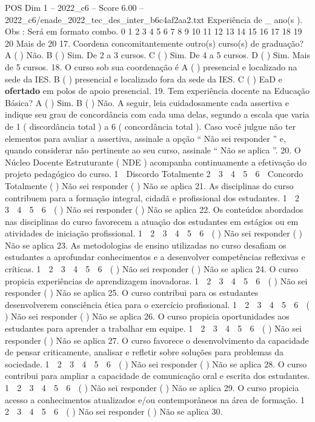 \begin{textsample}{POS Dim 1 – 2022\_c6 – Score 6.00 – 2022\_c6/enade\_2022\_tec\_des\_inter\_b6c4af2aa2.txt}
Experiência de \_ ano(s ).
Obs : Será em formato combo. 0 1 2 3 4 5 6 7 8 9 10 11 12 13 14 15 16 17 18 19 20 Mais de 20 17.
Coordena concomitantemente outro(s) curso(s) de graduação?
A ( ) Não.
B ( ) Sim.
De 2 a 3 cursos.
C ( ) Sim.
De 4 a 5 cursos.
D ( ) Sim.
Mais de 5 cursos. 18.
O curso sob sua coordenação é A ( ) presencial e localizado na sede da IES.
B ( ) presencial e localizado fora da sede da IES.
C ( ) EaD e \textbf{ofertado} em polos de apoio presencial. 19.
Tem experiência docente na Educação Básica?
A ( ) Sim.
B ( ) Não.
A seguir, leia cuidadosamente cada assertiva e indique seu grau de concordância com cada uma delas, segundo a escala que varia de 1 ( discordância total ) a 6 ( concordância total ).
Caso você julgue não ter elementos para avaliar a assertiva, assinale a opção “ Não sei responder ” e, quando considerar não pertinente ao seu curso, assinale “ Não se aplica ”. 20.
O Núcleo Docente Estruturante ( NDE ) acompanha continuamente a efetivação do projeto pedagógico do curso. 1 ⃝ Discordo Totalmente 2 ⃝ 3 ⃝ 4 ⃝ 5 ⃝ 6 ⃝ Concordo Totalmente ( ) Não sei responder ( ) Não se aplica 21.
As disciplinas do curso contribuem para a formação integral, cidadã e profissional dos estudantes. 1 ⃝ 2 ⃝ 3 ⃝ 4 ⃝ 5 ⃝ 6 ⃝ ( ) Não sei responder ( ) Não se aplica 22.
Os conteúdos abordados nas disciplinas do curso favorecem a atuação dos estudantes em estágios ou em atividades de iniciação profissional. 1 ⃝ 2 ⃝ 3 ⃝ 4 ⃝ 5 ⃝ 6 ⃝ ( ) Não sei responder ( ) Não se aplica 23.
As metodologias de ensino utilizadas no curso desafiam os estudantes a aprofundar conhecimentos e a desenvolver competências reflexivas e críticas. 1 ⃝ 2 ⃝ 3 ⃝ 4 ⃝ 5 ⃝ 6 ⃝ ( ) Não sei responder ( ) Não se aplica 24.
O curso propicia experiências de aprendizagem inovadoras. 1 ⃝ 2 ⃝ 3 ⃝ 4 ⃝ 5 ⃝ 6 ⃝ ( ) Não sei responder ( ) Não se aplica 25.
O curso contribui para os estudantes desenvolverem consciência ética para o exercício profissional. 1 ⃝ 2 ⃝ 3 ⃝ 4 ⃝ 5 ⃝ 6 ⃝ ( ) Não sei responder ( ) Não se aplica 26.
O curso propicia oportunidades aos estudantes para aprender a trabalhar em equipe. 1 ⃝ 2 ⃝ 3 ⃝ 4 ⃝ 5 ⃝ 6 ⃝ ( ) Não sei responder ( ) Não se aplica 27.
O curso favorece o desenvolvimento da capacidade de pensar criticamente, analisar e refletir sobre soluções para problemas da sociedade. 1 ⃝ 2 ⃝ 3 ⃝ 4 ⃝ 5 ⃝ 6 ⃝ ( ) Não sei responder ( ) Não se aplica 28.
O curso contribui para ampliar a capacidade de comunicação oral e escrita dos estudantes. 1 ⃝ 2 ⃝ 3 ⃝ 4 ⃝ 5 ⃝ 6 ⃝ ( ) Não sei responder ( ) Não se aplica 29.
O curso propicia acesso a conhecimentos atualizados e/ou contemporâneos na área de formação. 1 ⃝ 2 ⃝ 3 ⃝ 4 ⃝ 5 ⃝ 6 ⃝ ( ) Não sei responder ( ) Não se aplica 30.

\end{textsample}
